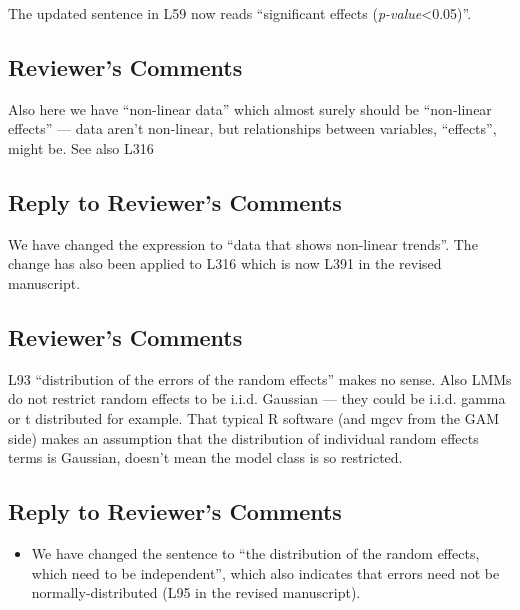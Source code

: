\documentclass[
]{article}
\providecommand{\tightlist}{%
  \setlength{\itemsep}{0pt}\setlength{\parskip}{0pt}}
\begin{document}
The updated sentence in L59 now reads ``significant effects (\emph{p-value}\textless0.05)''.

\hypertarget{reviewers-comments-18}{%
\subsection{Reviewer's Comments}\label{reviewers-comments-18}}

Also here we have ``non-linear data'' which almost surely should be ``non-linear effects'' --- data aren't non-linear, but relationships between variables, ``effects'', might be. See also L316

\hypertarget{section-19}{%
\subsection{\texorpdfstring{\textcolor{reviewersblue} {Reply to Reviewer's Comments}}{}}\label{section-19}}

We have changed the expression to ``data that shows non-linear trends''. The change has also been applied to L316 which is now L391 in the revised manuscript.

\hypertarget{reviewers-comments-19}{%
\subsection{Reviewer's Comments}\label{reviewers-comments-19}}

L93 ``distribution of the errors of the random effects'' makes no sense. Also LMMs do not restrict random effects to be i.i.d. Gaussian --- they could be i.i.d. gamma or t distributed for example. That typical R software (and mgcv from the GAM side) makes an assumption that the distribution of individual random effects terms is Gaussian, doesn't mean the model class is so restricted.

\hypertarget{section-20}{%
\subsection{\texorpdfstring{\textcolor{reviewersblue} {Reply to Reviewer's Comments}}{}}\label{section-20}}

\begin{itemize}
\tightlist
\item
  We have changed the sentence to ``the distribution of the random effects, which need to be independent'', which also indicates that errors need not be normally-distributed (L95 in the revised manuscript).
\end{itemize}
\end{document}

